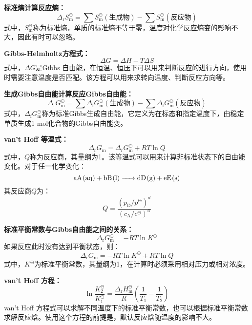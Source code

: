 \documentclass[
  10pt,
  twoside,
  openany,
  b5paper, %
  colorscheme = basic, %
  xits = false,
]{qyxf-book}
\begin{document}
\textbf{标准熵计算反应熵：}
	\begin{equation*}
		\Delta_\mathrm{r}S^\ominus_\mathrm{m} = \sum  S^\ominus_\mathrm{m}(\text{生成物}) - \sum  S^\ominus_\mathrm{m}(\text{反应物}) 
	\end{equation*}
式中，$S^\ominus_\mathrm{m}$称为标准熵，单质的标准熵不等于零，温度对化学反应熵变的影响不大，因此有时可以忽略。

\textbf{Gibbs-Helmholtz方程式：}
	\begin{equation*}
		\Delta G = \Delta H -T\Delta S
	\end{equation*}
式中，$\Delta G$是Gibbs 自由能，在恒温、恒压下可以用来判断反应的进行方向，使用时需要注意温度是否匹配。该方程可以用来求转向温度、判断反应方向等。

\textbf{生成Gibbs自由能计算反应Gibbs自由能：}
	\begin{equation*}
		\Delta_\mathrm{r}G^\ominus_\mathrm{m} = \sum \Delta_\mathrm{f}G^\ominus_\mathrm{m}(\text{生成物}) - \sum \Delta_\mathrm{f}G^\ominus_\mathrm{m}(\text{反应物}) 
	\end{equation*}
式中，$\Delta_\mathrm{f}G^\ominus_\mathrm{m}$称为标准Gibbs生成自由能，它定义为在标态和指定温度下，由稳定单质生成1 mol化合物的Gibbs自由能变。

\textbf{van't Hoff 等温式：}
	\begin{equation*}
		\Delta_\mathrm{r} G_\mathrm{m} = \Delta_\mathrm{r} G^\ominus_\mathrm{m} + RT\ln Q
	\end{equation*}
式中，$Q$称为反应商，其量纲为1。该等温式可以用来计算非标准状态下的自由能变化。对于任一化学变化：
\begin{equation*}
	\ce{aA(aq) + bB(l) -> dD(g) + eE(s)}
\end{equation*}
其反应商$Q$为：
\begin{equation*}
	Q = \frac{(p_\mathrm{D}/p^\ominus)^d}{(c_\mathrm{A}/c^\ominus)^a}
\end{equation*}

\textbf{标准平衡常数与Gibbs自由能之间的关系：}
	\begin{equation*}
		\Delta_\mathrm{r} G^\ominus_\mathrm{m} = -RT \ln K^\ominus
	\end{equation*}
如果反应此时没有达到平衡状态，则：
	\begin{equation*}
		\Delta_\mathrm{r} G_\mathrm{m} = -RT \ln K^\ominus + RT \ln Q
	\end{equation*}
式中，$K^\ominus$为标准平衡常数，其量纲为1，在计算时必须采用相对压力或相对浓度。

\textbf{van't Hoff 方程：}
	\begin{equation*}
		\ln \frac{K^\ominus_2}{K^\ominus_1} = \frac{\Delta_\mathrm{r} H^\ominus_\mathrm{m}}{R} \left(\frac{1}{T_1}- \frac{1}{T_2}\right)
	\end{equation*}
van't Hoff 方程式可以求解不同温度下的标准平衡常数，也可以根据标准平衡常数求解反应焓。使用这个方程的前提是，默认反应焓随温度的影响不大。
\end{document}
